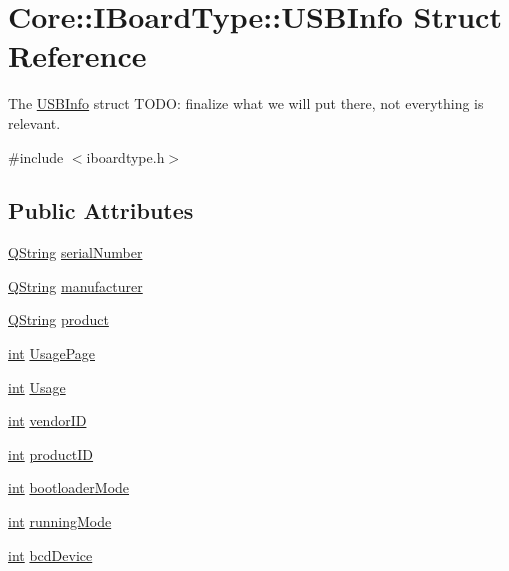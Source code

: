 \hypertarget{struct_core_1_1_i_board_type_1_1_u_s_b_info}{\section{Core\-:\-:I\-Board\-Type\-:\-:U\-S\-B\-Info Struct Reference}
\label{struct_core_1_1_i_board_type_1_1_u_s_b_info}
}


The \hyperlink{struct_core_1_1_i_board_type_1_1_u_s_b_info}{U\-S\-B\-Info} struct T\-O\-D\-O\-: finalize what we will put there, not everything is relevant.  




{\ttfamily \#include $<$iboardtype.\-h$>$}

\subsection*{Public Attributes}
\begin{DoxyCompactItemize}
\item 
\hyperlink{group___u_a_v_objects_plugin_gab9d252f49c333c94a72f97ce3105a32d}{Q\-String} \hyperlink{group___core_plugin_ga895802cf9e1054b0fbffdc0fc3ff9f30}{serial\-Number}
\item 
\hyperlink{group___u_a_v_objects_plugin_gab9d252f49c333c94a72f97ce3105a32d}{Q\-String} \hyperlink{group___core_plugin_gab425397b209f59d9c9cb215481f4e018}{manufacturer}
\item 
\hyperlink{group___u_a_v_objects_plugin_gab9d252f49c333c94a72f97ce3105a32d}{Q\-String} \hyperlink{group___core_plugin_ga5e622955d0d8c0244266ab1702000d92}{product}
\item 
\hyperlink{ioapi_8h_a787fa3cf048117ba7123753c1e74fcd6}{int} \hyperlink{group___core_plugin_gabcd3cddf005c60e8f45ea04eaa929ae3}{Usage\-Page}
\item 
\hyperlink{ioapi_8h_a787fa3cf048117ba7123753c1e74fcd6}{int} \hyperlink{group___core_plugin_gae9b3ee9d3f84e2dc3c25cb6f90a248ad}{Usage}
\item 
\hyperlink{ioapi_8h_a787fa3cf048117ba7123753c1e74fcd6}{int} \hyperlink{group___core_plugin_gaa22fe6fa3154cfff62d3e1860c8b7f7b}{vendor\-I\-D}
\item 
\hyperlink{ioapi_8h_a787fa3cf048117ba7123753c1e74fcd6}{int} \hyperlink{group___core_plugin_ga454be60cf2bba54712173af606a748b8}{product\-I\-D}
\item 
\hyperlink{ioapi_8h_a787fa3cf048117ba7123753c1e74fcd6}{int} \hyperlink{group___core_plugin_ga18f0e8647d887f9f5e37b406c5bd6976}{bootloader\-Mode}
\item 
\hyperlink{ioapi_8h_a787fa3cf048117ba7123753c1e74fcd6}{int} \hyperlink{group___core_plugin_ga8e598df3f5e0f673451cbaf22bcd71d7}{running\-Mode}
\item 
\hyperlink{ioapi_8h_a787fa3cf048117ba7123753c1e74fcd6}{int} \hyperlink{group___core_plugin_ga874a6af25c4e960a94c79e02c29a8b40}{bcd\-Device}
\end{DoxyCompactItemize}


